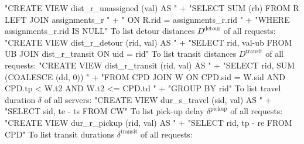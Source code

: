 "CREATE VIEW dist_r_unassigned (val) AS "
  + "SELECT SUM (rb) FROM R LEFT JOIN assignments_r "
  + "  ON R.rid = assignments_r.rid "
  + "WHERE assignments_r.rid IS NULL"
\nwendcode{}\nwdocspar
To list detour distances $D^\textrm{detour}$ of all requests:
\nwenddocs{}\endmoddef{}
"CREATE VIEW dist_r_detour (rid, val) AS "
  + "SELECT rid, val-ub FROM UB JOIN dist_r_transit ON uid = rid"
\nwendcode{}\nwdocspar
To list transit distances $D^\textrm{transit}$ of all requests:
\nwenddocs{}\endmoddef{}
"CREATE VIEW dist_r_transit (rid, val) AS "
  + "SELECT rid, SUM (COALESCE (dd, 0)) "
  + "FROM CPD JOIN W ON CPD.sid = W.sid AND CPD.tp < W.t2 AND W.t2 <= CPD.td "
  + "GROUP BY rid"
\nwendcode{}\nwdocspar
To list travel duration $\delta$ of all servers:
\nwenddocs{}\endmoddef{}
"CREATE VIEW dur_s_travel (sid, val) AS "
  + "SELECT sid, te - ts FROM CW"
\nwendcode{}\nwdocspar
To list pick-up delay $\delta^\textrm{pickup}$ of all requests:
\nwenddocs{}\endmoddef{}
"CREATE VIEW dur_r_pickup (rid, val) AS "
  + "SELECT rid, tp - re FROM CPD"
\nwendcode{}\nwdocspar
To list transit durations $\delta^\textrm{transit}$ of all requests:
\nwenddocs{}\endmoddef{}
